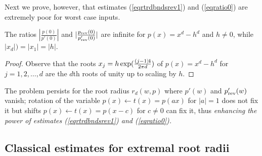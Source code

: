 \documentclass[runningheads]{llncs}
\begin{document}
 Next we prove, however,  that estimates (\ref{eqrtrdbndsrev1}) and (\ref{eqratio0}) are extremely poor for  worst case inputs.
\begin{theorem}\label{thrtr}
The ratios $|\frac{p(0)}{p'(0)}|$
and $|\frac{p_{\rm rev}(0)}{p_{\rm rev}'(0)}|$ are infinite for  $p(x)=x^d-h^d$ and $h\neq 0$, while  $|x_d|)=|x_1|=|h|$.
 \end{theorem}
 \begin{proof}
 Observe that
 the roots $x_j=h\exp(\frac{(j-1){\bf i}}{2\pi d})$ of $p(x)=x^d-h^d$
  for $j=1,2,\dots,d$   are the $d$th roots  of unity up to scaling by $h$.
 \end{proof}

The problem persists for the root radius $r_d(w,p)$  where  $p'(w)$ and  $p'_{\rm rev}(w)$ vanish;
 rotation of the variable  $p(x)\leftarrow t(x)=p(ax)$
for $|a|=1$ does not  fix it but  shifts $p(x)\leftarrow t(x)=p(x-c)$
for $c\neq 0$ can fix it, thus {\em enhancing the power of  estimates (\ref{eqrtrdbndsrev1}) and (\ref{eqratio0}).}

\subsection{Classical estimates for extremal root radii}\label{subsec:class_est}
\end{document}
